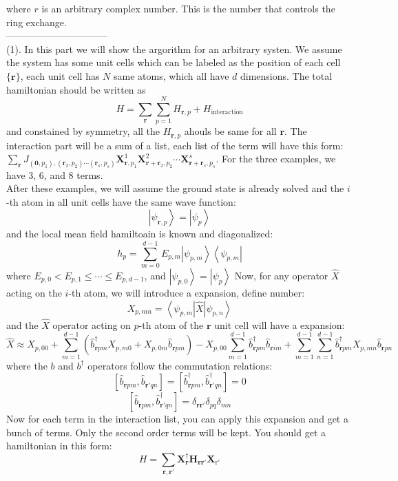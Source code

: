 \documentclass[letterpaper,10pt]{article}
\begin{document}
where $r$ is an arbitrary complex number. This is the number that controls the ring exchange.\\
--------------------------------\\
\indent (1). In this part we will show the argorithm for an arbitrary systen. We assume the system has some unit cells which can be labeled as the position of each cell $\{\bm{r}\}$, each unit cell has $N$ same atoms, which all have $d$ dimensions. The total hamiltonian should be written as $$
H=\sum_{\bm{r}}\sum_{p=1}^{N}H_{\bm{r},p}+H_{\mathrm{interaction}}
$$ and constained by symmetry, all the $H_{\bm{r},p}$ ahouls be same for all $\bm{r}$. The interaction part will be a sum of a list, each list of the term will have this form: $\sum_{\bm{r}}J_{(\bm{0},p_1),(\bm{r}_2,p_2)\cdots (\bm{r}_s,p_s)} \bm{X}^1_{\bm{r},p_1} \bm{X}^2_{\bm{r}+\bm{r}_2,p_2} \cdots\bm{X}^s_{\bm{r}+\bm{r}_s,p_s}$. For the three examples, we have 3, 6, and 8 terms. \\
 After these examples, we will assume the ground state is already solved and the $i$-th atom in all unit cells have the same wave function:$$
\left|\psi_{\bm{r},p}\right>=\left|\psi_p\right>
$$
and the local mean field hamiltoain is known and diagonalized:
$$
h_p=\sum_{m=0}^{d-1}E_{p,m}\left|\psi_{p,m}\right>\left<\psi_{p,m}\right|
$$
where $E_{p,0}<E_{p,1}\leqslant \cdots\leqslant E_{p,d-1}$, and $\left|\psi_{p,0}\right>=\left|\psi_p\right>$
Now, for any operator $\hat{X}$ acting on the $i$-th atom, we will introduce a expansion, define number: $$
X_{p,mn}=\left<\psi_{p,m}\right|\hat{X}\left|\psi_{p,n}\right>
$$
and the $\hat{X}$ operator acting on $p$-th  atom of the $\bm{r}$ unit cell will have a expansion:
$$
\hat{X}\approx X_{p,00}+\sum_{m=1}^{d-1}\left(\hat{b}_{\bm{r}pm}^{\dagger}X_{p,m0}+X_{p,0m}\hat{b}_{\bm{r}pm}\right)-X_{p,00}\sum_{m=1}^{d-1}\hat{b}^{\dagger}_{\bm{r}pm}\hat{b}_{\bm{r}im}
+\sum_{m=1}^{d-1}\sum_{n=1}^{d-1}\hat{b}^{\dagger}_{\bm{r}pm}X_{p,mn}\hat{b}_{\bm{r}pn}$$
where the $b$ and $b^{\dagger}$ operators follow the commutation relations:
$$
\left[\hat{b}_{\bm{r}pm},\hat{b}_{\bm{r}'qn}\right]=\left[\hat{b}^{\dagger}_{\bm{r}pm},\hat{b}^{\dagger}_{\bm{r}'qn}\right]=0$$
$$
\left[\hat{b}_{\bm{r}pm},\hat{b}^{\dagger}_{\bm{r}'qn}\right]=\delta_{\bm{r}\bm{r}'}\delta_{pq}\delta_{mn}$$
Now for each term in the interaction list, you can apply this expansion and get a bunch of terms. Only the second order terms will be kept. You should get a hamiltonian in this form:
 $$H=\sum_{\bm{r},\bm{r}'}\mathbf{X}^{\dagger}_{\bm{r}}\mathbf{H}_{\bm{r}\bm{r}'}\mathbf{X}_{\mathrm{r}'}$$
\end{document}
